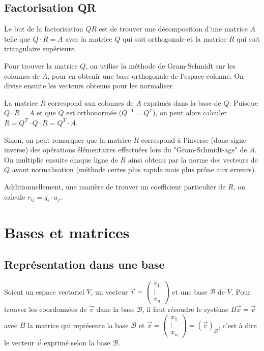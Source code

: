 \documentclass[10pt,a4paper]{book}
\begin{document}
\section{Factorisation QR}
Le but de la factorisation $QR$ est de trouver une décomposition d'une matrice $A$ telle que $Q\cdot R=A$ avec la matrice $Q$ qui soit orthogonale et la matrice $R$ qui soit triangulaire supérieure.\par 
Pour trouver la matrice $Q$, on utilise la méthode de Gram-Schmidt sur les colonnes de $A$, pour en obtenir une base orthogonale de l'espace-colonne. On divise ensuite les vecteurs obtenus pour les normaliser.\par 
La matrice $R$ correspond aux colonnes de $A$ exprimés dans la base de $Q$. Puisque $Q\cdot R=A$ et que $Q$ est orthonormée ($Q^{-1}=Q^T$), on peut alors calculer $R=Q^T\cdot Q\cdot R=Q^T\cdot A$. \par
Sinon, on peut remarquer que la matrice $R$ correspond à l'inverse (donc signe inverse) des opérations élémentaires effectuées lors du "Gram-Schmidt-age" de $A$. On multiplie ensuite chaque ligne de $R$ ainsi obtenu par la norme des vecteurs de $Q$ avant normalisation (méthode certes plus rapide mais plus prône aux erreurs).\par 
Additionnellement, une manière de trouver un coefficient particulier de $R$, on calcule $r_{ij} = q_i\cdot a_j$.

\chapter{Bases et matrices}

\section{Représentation dans une base}
Soient un espace vectoriel $V$, un vecteur $\vec{v} = \begin{pmatrix} v_1 \\ \vdots \\ v_n \end{pmatrix}$ et une base $\mathcal{B}$ de $V$. Pour trouver les coordonnées de $\vec{v}$ dans la base $\mathcal{B}$, il faut résoudre le système $B\vec{x} = \vec{v}$ avec $B$ la matrice qui représente la base $\mathcal{B}$ et $\vec{x} = \begin{pmatrix} x_1 \\ \vdots \\ x_n \end{pmatrix} = (\vec{v})_\mathcal{B}$, c'est à dire le vecteur $\vec{v}$ exprimé selon la base $\mathcal{B}$.
\end{document}
